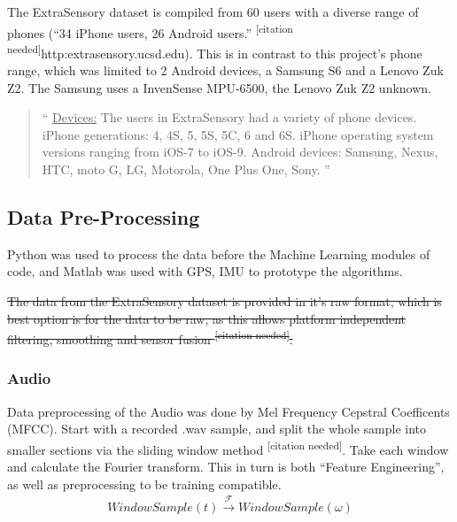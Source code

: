 \documentclass{UoNMCHA}
\newcommand{\citationneeded}{\textsuperscript{\color{blue} [citation needed]}}
\newcommand{\inlineQuote}[1]{``#1''}
\newcommand{\fancyquote}[1]{\begin{quotation}\inlineQuote{#1}\end{quotation}}
\numberwithin{equation}{section}
\begin{document}
The ExtraSensory dataset is compiled from 60 users with a diverse range of phones (\inlineQuote{34 iPhone users, 26 Android users.}\citationneeded http:\/\/extrasensory.ucsd.edu\/). This is in contrast to this project's phone range, which was limited to 2 Android devices, a Samsung S6 and a Lenovo Zuk Z2. The Samsung uses a InvenSense MPU-6500, the Lenovo Zuk Z2 unknown.

\fancyquote{
    \underline{Devices:}
    The users in ExtraSensory had a variety of phone devices.
    iPhone generations: 4, 4S, 5, 5S, 5C, 6 and 6S.
    iPhone operating system versions ranging from iOS-7 to iOS-9.
    Android devices: Samsung, Nexus, HTC, moto G, LG, Motorola, One Plus One, Sony.
}


\subsection{Data Pre-Processing}
Python was used to process the data before the Machine Learning modules of code, and Matlab was used with GPS, IMU to prototype the algorithms. 


 \sout{The data from the ExtraSensory dataset is provided in it's raw format, which is best option is for the data to be raw, as this allows platform independent filtering, smoothing and sensor fusion\citationneeded.} 

\subsubsection{Audio}
Data preprocessing of the Audio was done by Mel Frequency Cepstral Coefficents (MFCC). Start with a recorded .wav sample, and split the whole sample into smaller sections via the sliding window method\citationneeded. Take each window and calculate the Fourier transform. This in turn is both \inlineQuote{Feature Engineering}, as well as preprocessing to be training compatible. 
\begin{gather}%
    WindowSample(t) \xrightarrow{\mathscr{F}}  WindowSample(\omega)
\end{gather}



\end{document}
